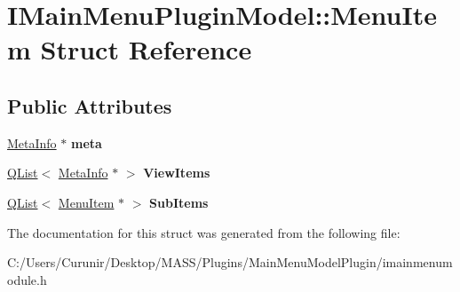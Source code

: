 \hypertarget{struct_i_main_menu_plugin_model_1_1_menu_item}{}\section{I\+Main\+Menu\+Plugin\+Model\+:\+:Menu\+Item Struct Reference}
\label{struct_i_main_menu_plugin_model_1_1_menu_item}
\subsection*{Public Attributes}
\begin{DoxyCompactItemize}
\item 
\mbox{\label{struct_i_main_menu_plugin_model_1_1_menu_item_a1750991191ace60981315c7095723346}} 
\hyperlink{struct_meta_info}{Meta\+Info} $\ast$ {\bfseries meta}
\item 
\mbox{\label{struct_i_main_menu_plugin_model_1_1_menu_item_a5576d4664cf1e226fbbbd5875239e0ae}} 
\hyperlink{class_q_list}{Q\+List}$<$ \hyperlink{struct_meta_info}{Meta\+Info} $\ast$ $>$ {\bfseries View\+Items}
\item 
\mbox{\label{struct_i_main_menu_plugin_model_1_1_menu_item_a945944fea3f6fe92c7fdec32bee522a8}} 
\hyperlink{class_q_list}{Q\+List}$<$ \hyperlink{struct_i_main_menu_plugin_model_1_1_menu_item}{Menu\+Item} $\ast$ $>$ {\bfseries Sub\+Items}
\end{DoxyCompactItemize}


The documentation for this struct was generated from the following file\+:\begin{DoxyCompactItemize}
\item 
C\+:/\+Users/\+Curunir/\+Desktop/\+M\+A\+S\+S/\+Plugins/\+Main\+Menu\+Model\+Plugin/imainmenumodule.\+h\end{DoxyCompactItemize}
